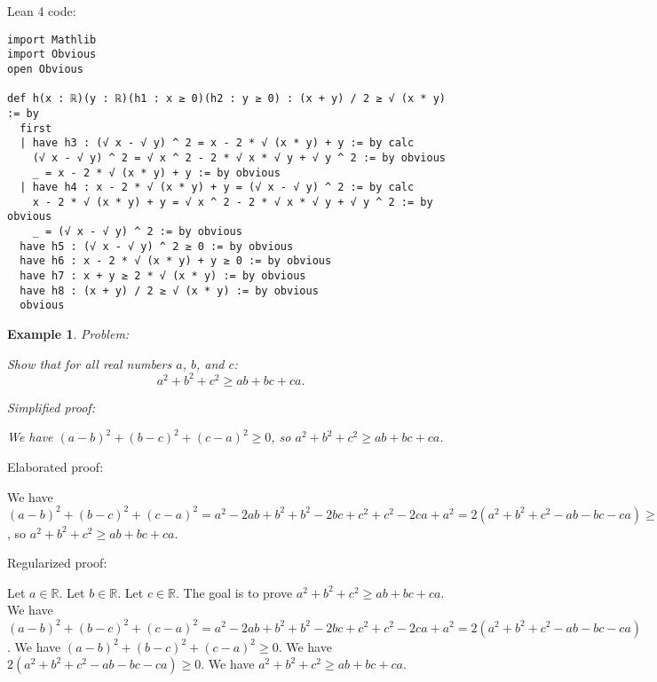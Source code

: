\documentclass{article}
\newtheorem{example}{Example}
\begin{document}
Lean 4 code:
\begin{tcolorbox}[colback=white!10, width=\linewidth]
\begin{lstlisting}[language=Lean4]
import Mathlib
import Obvious
open Obvious

def h(x : ℝ)(y : ℝ)(h1 : x ≥ 0)(h2 : y ≥ 0) : (x + y) / 2 ≥ √ (x * y) := by
  first
  | have h3 : (√ x - √ y) ^ 2 = x - 2 * √ (x * y) + y := by calc
    (√ x - √ y) ^ 2 = √ x ^ 2 - 2 * √ x * √ y + √ y ^ 2 := by obvious
    _ = x - 2 * √ (x * y) + y := by obvious
  | have h4 : x - 2 * √ (x * y) + y = (√ x - √ y) ^ 2 := by calc
    x - 2 * √ (x * y) + y = √ x ^ 2 - 2 * √ x * √ y + √ y ^ 2 := by obvious
    _ = (√ x - √ y) ^ 2 := by obvious
  have h5 : (√ x - √ y) ^ 2 ≥ 0 := by obvious
  have h6 : x - 2 * √ (x * y) + y ≥ 0 := by obvious
  have h7 : x + y ≥ 2 * √ (x * y) := by obvious
  have h8 : (x + y) / 2 ≥ √ (x * y) := by obvious
  obvious

\end{lstlisting}
\end{tcolorbox}


\begin{example}
Problem:
\begin{tcolorbox}[colback=yellow!10, width=\linewidth]
Show that for all real numbers $a$, $b$, and $c$:
    $$a^2 + b^2 + c^2 \geq ab + bc + ca.$$
\end{tcolorbox}

Simplified proof:
\begin{tcolorbox}[colback=blue!10, width=\linewidth]
We have $(a-b)^2+(b-c)^2+(c-a)^2 \ge 0$, so $a^2+b^2+c^2 \ge ab+bc+ca$.
\end{tcolorbox}
\end{example}

Elaborated proof:
\begin{tcolorbox}[colback=green!10, width=\linewidth]
We have $(a-b)^2+(b-c)^2+(c-a)^2 = a^2 - 2ab + b^2 + b^2 - 2bc + c^2 + c^2 - 2ca + a^2 = 2(a^2+b^2+c^2 - ab - bc - ca) \ge 0$, so $a^2+b^2+c^2 \ge ab+bc+ca$.
\end{tcolorbox}

Regularized proof:
\begin{tcolorbox}[colback=red!10, width=\linewidth]
Let $a\in\mathbb{R}$. Let $b\in\mathbb{R}$. Let $c\in\mathbb{R}$.
The goal is to prove $a^2+b^2+c^2 \ge ab+bc+ca$.
We have ${{(a-b)}}^2+{{(b-c)}}^2+{{(c-a)}}^2 = a^2 - 2ab + b^2 + b^2 - 2bc + c^2 + c^2 - 2ca + a^2 = 2(a^2+b^2+c^2 - ab - bc - ca)$.
We have ${{(a-b)}}^2+{{(b-c)}}^2+{{(c-a)}}^2 \ge 0$.
We have $2(a^2+b^2+c^2 - ab - bc - ca) \ge 0$.
We have $a^2+b^2+c^2 \ge ab+bc+ca$.
\end{tcolorbox}
\end{document}
